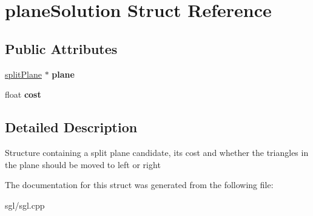 \hypertarget{structplane_solution}{}\section{plane\+Solution Struct Reference}
\label{structplane_solution}
\subsection*{Public Attributes}
\begin{DoxyCompactItemize}
\item 
\mbox{\label{structplane_solution_ad6c9c6f73f2d473915001d266fbc8d5d}} 
\hyperlink{classsplit_plane}{split\+Plane} $\ast$ {\bfseries plane}
\item 
\mbox{\label{structplane_solution_a8aae0a96589badef74ee4aeed61e9b74}} 
float {\bfseries cost}
\end{DoxyCompactItemize}


\subsection{Detailed Description}
Structure containing a split plane candidate, its cost and whether the triangles in the plane should be moved to left or right 

The documentation for this struct was generated from the following file\+:\begin{DoxyCompactItemize}
\item 
sgl/sgl.\+cpp\end{DoxyCompactItemize}
